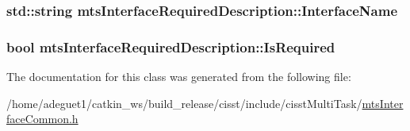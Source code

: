 \hypertarget{classmts_interface_required_description_a8ef893e8fc8881d31e85060b9d72fb84}{
\subsubsection[{Interface\-Name}]{\setlength{\rightskip}{0pt plus 5cm}std\-::string mts\-Interface\-Required\-Description\-::\-Interface\-Name}}\label{classmts_interface_required_description_a8ef893e8fc8881d31e85060b9d72fb84}
\hypertarget{classmts_interface_required_description_ae56c8fe1cb63d5e712edb530c6d91f2c}{
\subsubsection[{Is\-Required}]{\setlength{\rightskip}{0pt plus 5cm}bool mts\-Interface\-Required\-Description\-::\-Is\-Required}}\label{classmts_interface_required_description_ae56c8fe1cb63d5e712edb530c6d91f2c}


The documentation for this class was generated from the following file\-:\begin{DoxyCompactItemize}
\item 
/home/adeguet1/catkin\-\_\-ws/build\-\_\-release/cisst/include/cisst\-Multi\-Task/\hyperlink{mts_interface_common_8h}{mts\-Interface\-Common.\-h}\end{DoxyCompactItemize}
